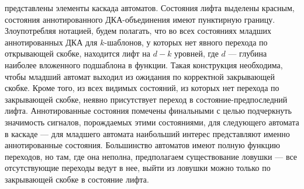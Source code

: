 представлены элементы каскада автоматов. Состояния 
лифта выделены красным, состояния аннотированного ДКА-объединения имеют пунктирную границу. 
Злоупотребляя нотацией, будем полагать, что во всех состояниях младших аннотированных ДКА 
для $k$-шаблонов, у которых нет явного перехода по открывающей скобке, находится лифт на 
$d-k$ уровней, где $d$ --- глубина наиболее вложенного подшаблона в функции. Такая 
конструкция необходима, чтобы младший автомат выходил из ожидания по корректной 
закрывающей скобке. Кроме того, из всех видимых состояний, из которых нет перехода по 
закрывающей скобке, неявно присутствует переход в состояние-предпоследний  лифта.
Аннотированные состояния помечены финальными с целью подчеркнуть значимость сигналов, порождаемых этими состояниями, для следующего автомата в каскаде --- для младшего автомата наибольший интерес представляют именно аннотированные состояния.
Большинство автоматов имеют полную функцию переходов, но там, где она неполна, предполагаем существование ловушки --- все отсутствующие переходы ведут в нее, выйти из ловушки можно только по закрывающей скобке в состояние лифта.

